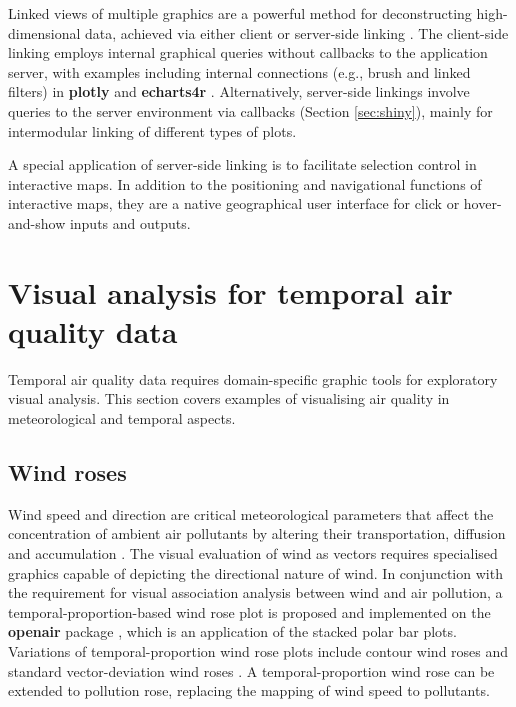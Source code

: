 \documentclass{aucklandthesis}
\begin{document}
Linked views of multiple graphics are a powerful method for deconstructing high-dimensional data, achieved via either client or server-side linking \autocite{plotly}. The client-side linking employs internal graphical queries without callbacks to the application server, with examples including internal connections (e.g., brush and linked filters) in \textbf{plotly} \autocite{plotly} and \textbf{echarts4r} \autocite{echarts4r}. Alternatively, server-side linkings involve queries to the server environment via callbacks (Section \ref{sec:shiny}), mainly for intermodular linking of different types of plots.

A special application of server-side linking is to facilitate selection control in interactive maps. In addition to the positioning and navigational functions of interactive maps, they are a native geographical user interface for click or hover-and-show inputs and outputs.

\hypertarget{visual-analysis-for-temporal-air-quality-data}{%
\section{Visual analysis for temporal air quality data}\label{visual-analysis-for-temporal-air-quality-data}}

Temporal air quality data requires domain-specific graphic tools for exploratory visual analysis. This section covers examples of visualising air quality in meteorological and temporal aspects.

\hypertarget{sec:wind-rose}{%
\subsection{Wind roses}\label{sec:wind-rose}}

Wind speed and direction are critical meteorological parameters that affect the concentration of ambient air pollutants by altering their transportation, diffusion and accumulation \autocite{wind}. The visual evaluation of wind as vectors requires specialised graphics capable of depicting the directional nature of wind. In conjunction with the requirement for visual association analysis between wind and air pollution, a temporal-proportion-based wind rose plot is proposed and implemented on the \textbf{openair} package \autocite{openair}, which is an application of the stacked polar bar plots. Variations of temporal-proportion wind rose plots include contour wind roses \autocite{cwr} and standard vector-deviation wind roses \autocite{vdwr}. A temporal-proportion wind rose can be extended to pollution rose, replacing the mapping of wind speed to pollutants.
\end{document}
